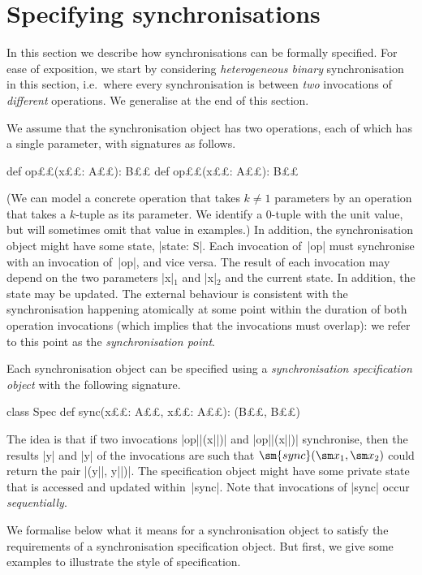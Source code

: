 \section{Specifying synchronisations}
\label{sec:spec}

In this section we describe how synchronisations can be formally specified.
For ease of exposition, we start by considering \emph{heterogeneous binary}
synchronisation in this section, i.e.~where every synchronisation is between
\emph{two} invocations of \emph{different} operations.  We generalise at the
end of this section.

We assume that the synchronisation object has two operations, each of which
has a single parameter, with signatures as follows.
%
\begin{scala}
  def op££(x££: A££): B££
  def op££(x££: A££): B££
\end{scala}
%
(We can model a concrete operation that takes $k \ne 1$ parameters by an
operation that takes a $k$-tuple as its parameter.  We identify a 0-tuple with
the unit value, but will sometimes omit that value in examples.)
%
In addition, the synchronisation object might have some state, |state: S|.
Each invocation of~|op| must synchronise with an invocation of~|op|, and
vice versa.  The result of each invocation may depend on the two parameters
|x|$_1$ and |x|$_2$ and the current state.  In addition, the state may be
updated.  The external behaviour is consistent with the synchronisation
happening atomically at some point within the duration of both operation
invocations (which implies that the invocations must overlap): we refer to this
point as the \emph{synchronisation point}.

Each synchronisation object can be specified using a \emph{synchronisation
  specification object} with the following signature.
%
\begin{scala}
class Spec{
  def sync(x££: A££, x££: A££): (B££, B££)
}
\end{scala}
%
The idea is that if two invocations |op||(x||)| and |op||(x||)|
synchronise, then the results |y| and |y| of the invocations are such
that $\sm{sync}(\sm x_1, \sm x_2)$ could return the pair |(y||, y||)|.
The specification object might have some private state that is accessed and
updated within~|sync|.  Note that invocations of |sync| occur
\emph{sequentially}.

We formalise below what it means for a synchronisation object to satisfy the
requirements of a synchronisation specification object.  But first, we give
some examples to illustrate the style of specification. 

